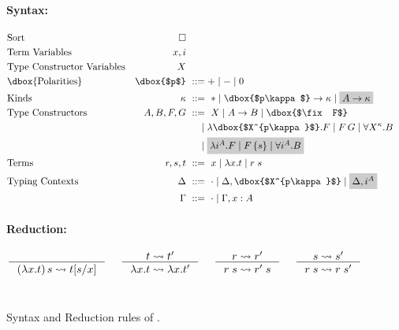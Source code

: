 \begin{figure}\begin{singlespace}
	\small
\paragraph{Syntax:}
\begin{align*}
\!\!\!\!\!\!\!\!&\text{Sort}
 	& \square
	\\
\!\!\!\!\!\!\!\!&\text{Term Variables}
 	& x,i
\\
\!\!\!\!\!\!\!\!&\text{Type Constructor Variables}
 	& X
\\
\!\!\!\!\!\!\!\!&\text{\dbox{Polarities}}
	& \dbox{$p$} &~ ::= + \mid - \mid 0
\\
\!\!\!\!\!\!\!\!&\text{Kinds}
 	& \kappa		&~ ::= ~ *
				\mid \dbox{$p\kappa$} -> \kappa
				\mid \newFi{A -> \kappa}
\\
\!\!\!\!\!\!\!\!&\text{Type Constructors}
	& A,B,F,G		&~ ::= ~ X
				\mid A -> B
				\mid \dbox{$\fix F$} \\ &&& ~\quad
				\mid \lambda \dbox{$X^{p\kappa}$}.F
				\mid F\,G
				\mid \forall X^\kappa . B \\ &&& ~\quad
				\mid \newFi{\lambda i^A.F
				\mid F\,\{s\}
				\mid \forall i^A . B}
\\
\!\!\!\!\!\!\!\!&\text{Terms}
	& r,s,t			&~ ::= ~ x \mid \lambda x.t \mid r\;s
\\
\!\!\!\!\!\!\!\!&\text{Typing Contexts}
	& \Delta		&~ ::= ~ \cdot
				\mid \Delta,\dbox{$X^{p\kappa}$}
				\mid \newFi{\Delta, i^A} \\
&	& \Gamma		&~ ::= ~ \cdot
				\mid \Gamma, x : A
\end{align*}
\paragraph{Reduction:} 
\[ 
   \inference{}{(\lambda x.t)\,s \rightsquigarrow t[s/x]}
 ~~~~
   \inference{t \rightsquigarrow t'}{\lambda x.t \rightsquigarrow \lambda x.t'}
 ~~~~
   \inference{r \rightsquigarrow r'}{r\;s \rightsquigarrow r'\;s}
 ~~~~
   \inference{s \rightsquigarrow s'}{r\;s \rightsquigarrow r\;s'}
\]
~\\
\end{singlespace}
\caption{Syntax and Reduction rules of \Fixi.}
\label{fig:Fixi}
\end{figure}

